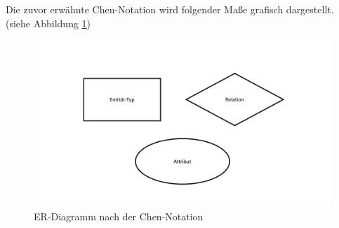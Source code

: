 		Die zuvor erwähnte Chen-Notation wird folgender Maße grafisch dargestellt. (siehe Abbildung \ref{fig:chennotation})
					\begin{figure}[H]
						\centering 
						\includegraphics[scale=0.3]{img/ChenNotationERDiagramm.pdf}
						\captionsetup{format=hang}
						\caption[ER-Diagramm Chen-Notation]{\label{fig:chennotation} ER-Diagramm nach der Chen-Notation }
					\end{figure}
		
